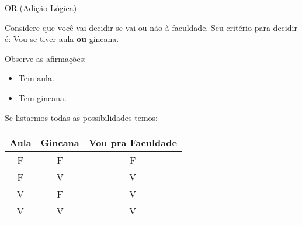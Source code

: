 \begin{frame}{OR (Adição Lógica)} 

	Considere que você vai decidir se vai ou não à faculdade. Seu critério para decidir é: Vou se tiver aula \textbf{ou} gincana.

	Observe as afirmações:

	\vspace{0.2cm}
	\begin{itemize}
		\item Tem aula.
		\item Tem gincana.
	\end{itemize}

	Se listarmos todas as possibilidades temos:

		\center 
		\vspace{0.4cm}

		\begin{tabular}{|c|c|c|} \hline 
			\textbf{Aula} & \textbf{Gincana} & \textbf{Vou pra Faculdade} \\ \hline 
			F & F & F \\ \hline 
			F & V & V \\ \hline 
			V & F & V \\ \hline 
			V & V & V \\ \hline 
		\end{tabular} 



\end{frame}



